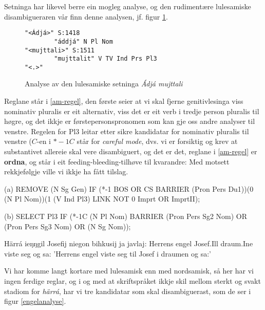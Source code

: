 \documentclass[a4paper,nynorsk]{article}
\begin{document}
Setninga har likevel berre ein mogleg analyse, og den rudimentære lulesamiske disambigueraren vår finn denne analysen, jf. figur \ref{am}. %

\begin{figure}[htbp]
\begin{center}
\begin{verbatim}
"<Ádjá>" S:1418
        "áddjá" N Pl Nom
"<mujttali>" S:1511
        "mujttalit" V TV Ind Prs Pl3
"<.>"
\end{verbatim}
\caption{Analyse av den lulesamiske setninga \textit{Ádjá mujttali}}
\label{am}
\end{center}
\end{figure}

Reglane står i \ref{am-regel}, den første seier at vi skal fjerne genitivlesinga viss nominativ pluralis er eit alternativ, viss det er eit verb i tredje person pluralis til høgre, og det ikkje er førstepersonspronomen som kan gje  oss andre analyser til venstre. Regelen for Pl3 leitar etter sikre kandidatar for nominativ pluralis til venstre ($C$-en i $*-1C$ står for \textit{careful mode}, dvs. vi er forsiktig og krev at substantivet allereie skal vere disambiguert, og det er det, reglane i \ref{am-regel} er \textbf{ordna}, og står i eit feeding-bleeding-tilhøve til kvarandre: Med motsett rekkjefølgje ville vi ikkje ha fått tilslag. %

\begin{example}\label{am-regel}
\item[(a)] REMOVE (N Sg Gen) IF (*-1 BOS OR CS BARRIER (Pron Pers Du1))(0 (N Pl Nom))(1 (V Ind Pl3) LINK NOT 0 Imprt OR ImprtII);
\item[(b)] SELECT Pl3 IF (*-1C (N Pl Nom) BARRIER (Pron Pers Sg2 Nom) OR  (Pron Pers Sg3 Nom) OR (N Sg Nom));
\end{example}



\begin{example}\label{engel}
\gll Härrá ieŋŋgil Josefij niegon bihkusij ja javlaj:
    Herrens engel Josef.Ill draum.Ine {viste seg} og sa:
\glt 'Herrens engel viste seg til Josef i draumen og sa:' 
\glend    
\end{example}

Vi har komme langt kortare med lulesamisk enn med nordsamisk, så her har vi ingen ferdige reglar, og i og med at skriftspråket ikkje skil mellom sterkt og svakt stadiom for \textit{härrá}, har vi tre kandidatar som skal disambiguerast, som de ser i figur \ref{engelanalyse}. %
\end{document}
